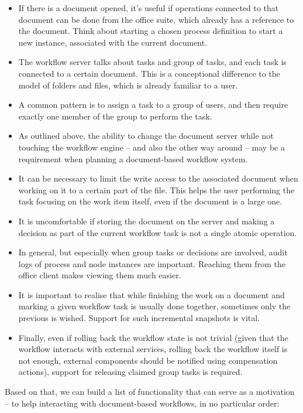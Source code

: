 \begin{itemize}
\item If there is a document opened, it's useful if operations connected to
that document can be done from the office suite, which already has a reference
to the document. Think about starting a chosen process definition to start a
new instance, associated with the current document.
\item The workflow server talks about tasks and group of tasks, and each task
is connected to a certain document. This is a conceptional difference to the model of
folders and files, which is already familiar to a user.
\item A common pattern is to assign a task to a group of users, and then
require exactly one member of the group to perform the task.
\item As outlined above, the ability to change the document server while not
touching the workflow engine -- and also the other way around -- may be a
requirement when planning a document-based workflow system.
\item It can be necessary to limit the write access to the associated document
when working on it to a certain part of the file. This helps the user
performing the task focusing on the work item itself, even if the document is a
large one.
\item It is uncomfortable if storing the document on the server and making a
decision as part of the current workflow task is not a single atomic operation.
\item In general, but especially when group tasks or decisions are involved, audit logs of
process and node instances are important. Reaching them from the office client
makes viewing them much easier.
\item It is important to realise that while finishing the work on a document
and marking a given workflow task is usually done together, sometimes only the
previous is wished. Support for such incremental snapshots is vital.
\item Finally, even if rolling back the workflow state is not trivial (given
that the workflow interacts with external services, rolling back the workflow
itself is not enough, external components should be notified using compensation
actions), support for releasing claimed group tasks is required.
\end{itemize}

Based on that, we can build a list of functionality that can serve as a
motivation -- to help interacting with document-based workflows, in no
particular order:

